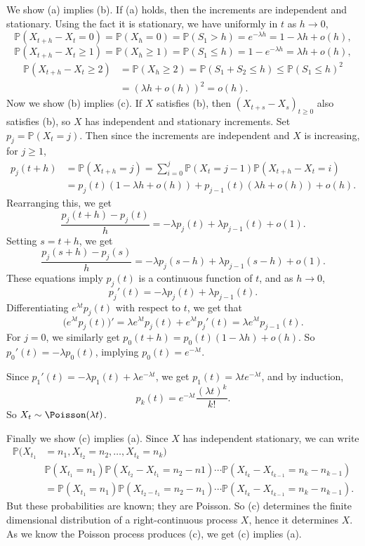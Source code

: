 \documentclass[12pt]{article}
\begin{document}
\begin{proofbox}
	We show (a) implies (b). If (a) holds, then the increments are independent and stationary. Using the fact it is stationary, we have uniformly in $t$ as $h \to 0$,
	\[
	\mathbb{P}(X_{t+h}-X_t = 0) = \mathbb{P}(X_h = 0) = \mathbb{P}(S_1 > h) = e^{-\lambda h} = 1 - \lambda h + o(h),
	\]
	\[
	\mathbb{P}(X_{t+h} - X_t \geq 1) = \mathbb{P}(X_h \geq 1) = \mathbb{P}(S_1 \leq h) = 1 - e^{-\lambda h} = \lambda h + o(h)
	,\]
	\begin{align*}
		\mathbb{P}(X_{t+h}-X_t \geq 2) &= \mathbb{P}(X_h \geq 2) = \mathbb{P}(S_1 + S_2 \leq h) \leq \mathbb{P}(S_1 \leq h)^2 \\
					       &= (\lambda h + o(h))^2 = o(h).
	\end{align*}
	Now we show (b) implies (c). If $X$ satisfies (b), then $(X_{t+s}-X_s)_{t \geq 0}$ also satisfies (b), so $X$ has independent and stationary increments. Set $p_j = \mathbb{P}(X_t = j)$. Then since the increments are independent and $X$ is increasing, for $j \geq 1$,
	\begin{align*}
		p_j(t+h) &= \mathbb{P}(X_{t+h} = j) = \sum_{i = 0}^{j} \mathbb{P}(X_t = j-1) \mathbb{P}(X_{t+h} - X_t = i) \\
			 &= p_j(t)(1 - \lambda h + o(h)) + p_{j-1}(t)(\lambda h + o(h)) + o(h).
	\end{align*}
	Rearranging this, we get
	\[
	\frac{p_j(t+h) - p_j(t)}{h} = - \lambda p_j(t) + \lambda p_{j-1}(t) + o(1)
	.\]
	Setting $s = t+h$, we get
	\[
	\frac{p_j(s+h) - p_j(s)}{h} = - \lambda p_j(s-h) + \lambda p_{j-1}(s-h) + o(1)
	.\] 
	These equations imply $p_j(t)$ is a continuous function of $t$, and as $h \to 0$,
	\[
	p_j'(t) = - \lambda p_j(t) + \lambda p_{j-1}(t)
	.\]
	Differentiating $e^{\lambda t}p_j(t)$ with respect to $t$, we get that
	\[
		\bigl(e^{\lambda t}p_j(t)\bigr)' = \lambda e^{\lambda t}p_j(t) + e^{\lambda t}p_j'(t) = \lambda e^{\lambda t}p_{j-1}(t)
	.\]
	For $j = 0$, we similarly get $p_0(t+h) = p_0(t)(1 - \lambda h) + o(h)$. So $p_0'(t) = - \lambda p_0(t)$, implying $p_0(t) = e^{-\lambda t}$.

	Since $p_1'(t) = - \lambda p_1(t) + \lambda e^{-\lambda t}$, we get $p_1(t) = \lambda t e^{-\lambda t}$, and by induction,
	\[
	p_k(t) = e^{-\lambda t} \frac{(\lambda t)^{k}}{k!}
	.\]
	So $X_t \sim \Poisson(\lambda t)$.

	Finally we show (c) implies (a). Since $X$ has independent stationary, we can write
	\begin{align*}
		\mathbb{P}(X_{t_1} &= n_1, X_{t_2} = n_2, \ldots, X_{t_k} = n_k) \\
				   &\mathbb{P}(X_{t_1} = n_1) \mathbb{P}(X_{t_2} - X_{t_1} = n_2 - n1) \cdots \mathbb{P}(X_{t_k} - X_{t_{k-1}} = n_k - n_{k-1}) \\
				   &= \mathbb{P}(X_{t_1} = n_1) \mathbb{P}(X_{t_2 - t_1} = n_2 - n_1) \cdots \mathbb{P}(X_{t_k} - X_{t_{k-1}} = n_k - n_{k-1}).
	\end{align*}
	But these probabilities are known; they are Poisson. So (c) determines the finite dimensional distribution of a right-continuous process $X$, hence it determines $X$. As we know the Poisson process produces (c), we get (c) implies (a).
\end{proofbox}
\end{document}
